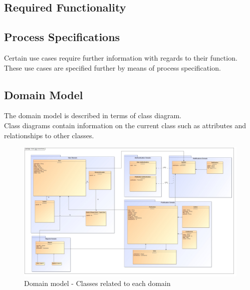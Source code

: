 \documentclass{article}
\begin{document}
		\subsection{Required Functionality}\label{subsec:requiredfunctionionality}
	
		\subsection{Process Specifications}\label{subsec:processspecification}
		Certain use cases require further information with regards to their function.\\ These use cases are specified further by means of process specification.
		
		\subsection{Domain Model}\label{subsec:domainmodel}
		The domain model is described in terms of class diagram.\\ Class diagrams contain information on the current class such as attributes and relationships to other classes.
			\begin{figure}[h]
				
				\includegraphics[width=\linewidth]{../Diagrams/Domain Model/domainModel.jpg}
				\caption{ Domain model - Classes related to each domain }
			\end{figure}
			
\end{document}
